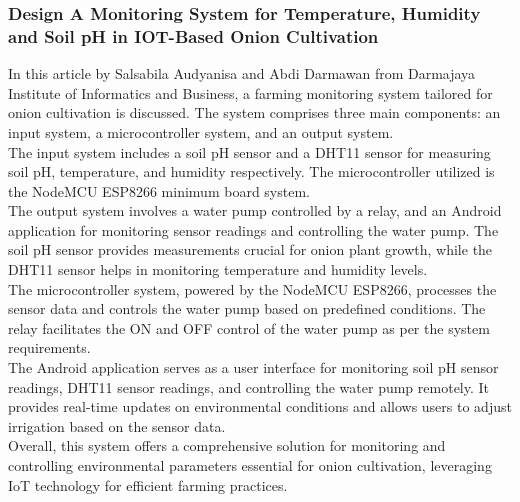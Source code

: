 \documentclass[12pt, a4paper]{article}
\begin{document}
\subsubsection{Design A Monitoring System for Temperature, Humidity and Soil pH in IOT-Based Onion Cultivation}
In this article by Salsabila Audyanisa and Abdi Darmawan \cite{audyanisa2024design} from Darmajaya Institute of Informatics and Business, a farming monitoring system tailored for onion cultivation is discussed. The system comprises three main components: an input system, a microcontroller system, and an output system.\\
The input system includes a soil pH sensor and a DHT11 sensor for measuring soil pH, temperature, and humidity respectively. The microcontroller utilized is the NodeMCU ESP8266 minimum board system.\\
The output system involves a water pump controlled by a relay, and an Android application for monitoring sensor readings and controlling the water pump. The soil pH sensor provides measurements crucial for onion plant growth, while the DHT11 sensor helps in monitoring temperature and humidity levels.\\
The microcontroller system, powered by the NodeMCU ESP8266, processes the sensor data and controls the water pump based on predefined conditions. The relay facilitates the ON and OFF control of the water pump as per the system requirements.\\
The Android application serves as a user interface for monitoring soil pH sensor readings, DHT11 sensor readings, and controlling the water pump remotely. It provides real-time updates on environmental conditions and allows users to adjust irrigation based on the sensor data.\\
Overall, this system offers a comprehensive solution for monitoring and controlling environmental parameters essential for onion cultivation, leveraging IoT technology for efficient farming practices.
\end{document}
